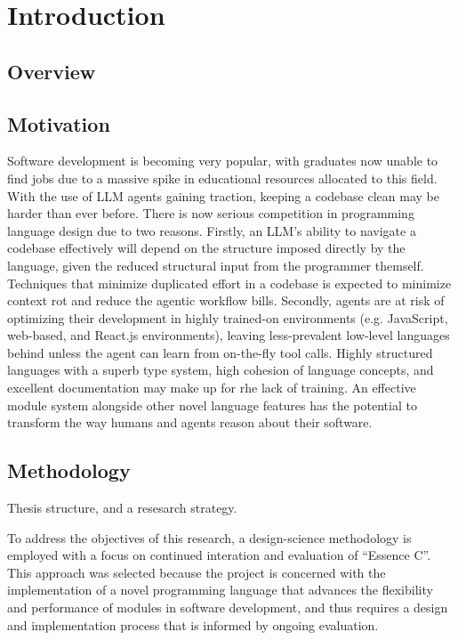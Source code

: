 \documentclass[12pt,a4paper,twoside]{report}
\begin{document}
\newpage

\chapter{Introduction}

\section{Overview}



\section{Motivation}

Software development is becoming very popular, with graduates now unable to find jobs due to a massive spike in educational resources allocated to this field. With the use of LLM agents gaining traction, keeping a codebase clean may be harder than ever before. There is now serious competition in programming language design due to two reasons. Firstly, an LLM's ability to navigate a codebase effectively will depend on the structure imposed directly by the language, given the reduced structural input from the programmer themself. Techniques that minimize duplicated effort in a codebase is expected to minimize context rot and reduce the agentic workflow bills. Secondly, agents are at risk of optimizing their development in highly trained-on environments (e.g. JavaScript, web-based, and React.js environments), leaving less-prevalent low-level languages behind unless the agent can learn from on-the-fly tool calls. Highly structured languages with a superb type system, high cohesion of language concepts, and excellent documentation may make up for rhe lack of training. An effective module system alongside other novel language features has the potential to transform the way humans and agents reason about their software.

\section{Methodology}

Thesis structure, and a resesarch strategy.

To address the objectives of this research, a design-science methodology is employed with a focus on continued interation and evaluation of ``Essence C''. This approach was selected because the project is concerned with the implementation of a novel programming language that advances the flexibility and performance of modules in software development, and thus requires a design and implementation process that is informed by ongoing evaluation.
\end{document}
